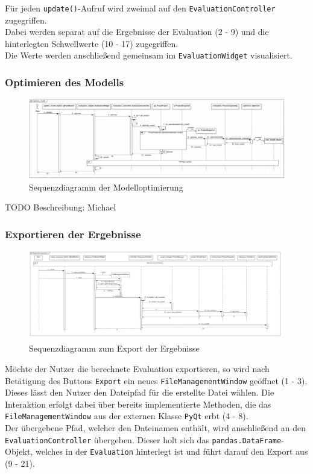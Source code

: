 \documentclass{article}
\begin{document}
Für jeden \texttt{update()}-Aufruf wird zweimal auf den \texttt{EvaluationController} zugegriffen. \\
Dabei werden separat auf die Ergebnisse der Evaluation (2 - 9) und die hinterlegten Schwellwerte (10 - 17) zugegriffen. \\
Die Werte werden anschließend gemeinsam im \texttt{EvaluationWidget} visualisiert.

\subsubsection{Optimieren des Modells}
\begin{figure}[H]%
    \centering
    \includegraphics[width=13cm]{entwurf/Entwurf_dokument/img/Michael/sd_optimize_model.png}
    \caption{Sequenzdiagramm der Modelloptimierung}
\end{figure}

TODO Beschreibung: Michael


\subsubsection{Exportieren der Ergebnisse}
\begin{figure}[H]%
    \centering
    \includegraphics[width=13cm]{entwurf/Entwurf_dokument/img/Damian/Ergebnisse exportieren.png}
    \caption{Sequenzdiagramm zum Export der Ergebnisse}
    \label{fig:sq:ExportEvaluation}
\end{figure}


Möchte der Nutzer die berechnete Evaluation exportieren, so wird nach Betätigung des Buttons \texttt{Export} ein neues \texttt{FileManagementWindow} geöffnet (1 - 3). \\
Dieses lässt den Nutzer den Dateipfad für die erstellte Datei wählen. Die Interaktion erfolgt dabei über bereits implementierte Methoden, die das \texttt{FileManagementWindow} aus der externen Klasse \texttt{PyQt} erbt (4 - 8). \\
Der übergebene Pfad, welcher den Dateinamen enthält, wird anschließend an den \texttt{EvaluationController} übergeben. Dieser holt sich das \texttt{pandas.DataFrame}-Objekt, welches in der \texttt{Evaluation} hinterlegt ist und führt darauf den Export aus (9 - 21).
\end{document}
